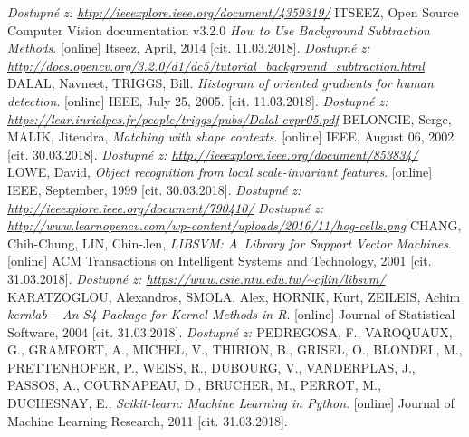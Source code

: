 \begin{thebibliography}{99}
 		\textit{Dostupné z: \url{http://ieeexplore.ieee.org/document/4359319/}}
	ITSEEZ, Open Source Computer Vision documentation v3.2.0 \textit{How to Use Background Subtraction Methods.} [online] Itseez, April, 2014 [cit. 11.03.2018].
		\textit{Dostupné z: \url{http://docs.opencv.org/3.2.0/d1/dc5/tutorial_background_subtraction.html}}
	 {DALAL, Navneet, TRIGGS, Bill. \textit{Histogram of oriented gradients for human detection}. [online] IEEE, July 25, 2005. [cit. 11.03.2018].
		\textit{Dostupné z: \url{https://lear.inrialpes.fr/people/triggs/pubs/Dalal-cvpr05.pdf}}}
	 BELONGIE, Serge, MALIK, Jitendra, \textit{Matching with shape contexts}. [online] IEEE, August 06, 2002 [cit. 30.03.2018]. 
 		\textit{Dostupné z: \url{http://ieeexplore.ieee.org/document/853834/}}
 	 LOWE, David, \textit{Object recognition from local scale-invariant features}. [online] IEEE, September, 1999 [cit. 30.03.2018]. 
 		\textit{Dostupné z: \url{http://ieeexplore.ieee.org/document/790410/}}
	 \textit{Dostupné z: \url{http://www.learnopencv.com/wp-content/uploads/2016/11/hog-cells.png}}
	 CHANG, Chih-Chung, LIN, Chin-Jen, \textit{LIBSVM: A~Library for Support Vector Machines}. [online] ACM Transactions on Intelligent Systems and Technology, 2001 [cit. 31.03.2018]. 
 		\textit{Dostupné z: \url{https://www.csie.ntu.edu.tw/~cjlin/libsvm/}}
 	 KARATZOGLOU, Alexandros, SMOLA, Alex, HORNIK, Kurt, ZEILEIS, Achim \textit{kernlab -- An {S4} Package for Kernel Methods in {R}}. [online] Journal of Statistical Software, 2004 [cit. 31.03.2018]. 
 		\textit{Dostupné z: \url{}}
 	 PEDREGOSA, F., VAROQUAUX, G., GRAMFORT, A., MICHEL, V., THIRION, B., GRISEL, O., BLONDEL, M., PRETTENHOFER, P., WEISS, R., DUBOURG, V., VANDERPLAS, J., PASSOS, A., COURNAPEAU, D., BRUCHER, M., PERROT, M., DUCHESNAY, E., \textit{Scikit-learn: Machine Learning in Python}. [online] Journal of Machine Learning Research, 2011 [cit. 31.03.2018]. 

\end{thebibliography}
